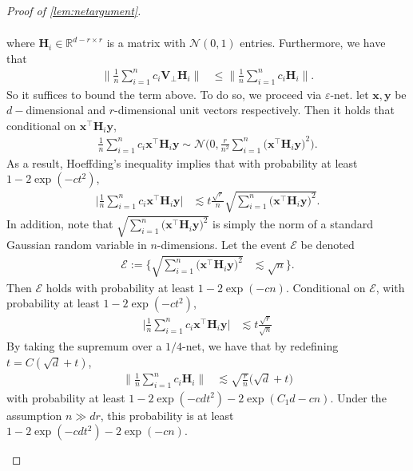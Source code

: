 \documentclass[10pt]{article}
\newcommand{\eps}{\ensuremath{\varepsilon}}
\renewcommand{\t}{^{\top}}
\theoremstyle{definition}
\begin{document}
\begin{proof}[Proof of \cref{lem:netargument}]
\begin{itemize}
\begin{align}
    \end{align}
    where $\bm{H}_i \in \mathbb{R}^{d-r \times r}$ is a matrix with $\mathcal{N}(0,1)$ entries. Furthermore, we have that
    \begin{align}
        \bigg\| \frac{1}{n} \sum_{i=1}^{n} c_i \bm{V}_{\perp} \bm{H}_i \bigg\| &\leq \bigg\| \frac{1}{n} \sum_{i=1}^{n} c_i \bm{H}_i \bigg\|.
    \end{align}
    So it suffices to bound the term above.  To do so, we proceed via $\eps$-net.  let $\bm{x}, \bm{y}$ be $d-$dimensional and $r$-dimensional unit vectors respectively.  Then it holds that conditional on $\bm{x}\t \bm{H}_i \bm{y}$, 
    \begin{align}
        \frac{1}{n} \sum_{i=1}^{n} c_i \bm{x}\t \bm{H}_i \bm{y} \sim \mathcal{N} \bigg( 0, \frac{r}{n^2} \sum_{i=1}^{n} \big(\bm{x}\t \bm{H}_i \bm{y} \big)^2 \bigg).
    \end{align}
    As a result, Hoeffding's inequality implies that with probability at least $1 - 2\exp(-c t^2)$,
    \begin{align}
        \bigg| \frac{1}{n}  \sum_{i=1}^{n} c_i \bm{x}\t \bm{H}_i \bm{y} \bigg| &\lesssim t \frac{\sqrt{r}}{n} \sqrt{\sum_{i=1}^{n} \big( \bm{x}\t \bm{H}_i \bm{y} \big)^2 }.
    \end{align}
    In addition, note that $\sqrt{\sum_{i=1}^{n} \big( \bm{x}\t \bm{H}_i \bm{y} \big)^2 }$ is simply the norm of a standard Gaussian random variable in $n$-dimensions. Let the event $\mathcal{E}$ be denoted
    \begin{align}
        \mathcal{E} := \bigg\{ \sqrt{\sum_{i=1}^{n} \big( \bm{x}\t \bm{H}_i \bm{y} \big)^2 } &\lesssim \sqrt{n} \bigg\}.
    \end{align}
    Then $\mathcal{E}$ holds with probability at least $1 -2 \exp( - c n)$.  Conditional on $\mathcal{E}$, with probability at least $1 - 2 \exp(- c t^2) $,
    \begin{align}
         \bigg| \frac{1}{n}  \sum_{i=1}^{n} c_i \bm{x}\t \bm{H}_i \bm{y} \bigg| &\lesssim t \frac{\sqrt{r}}{\sqrt{n}} 
    \end{align}
    By taking the supremum over a $1/4$-net, we have that by redefining $t = C( \sqrt{d} + t )$, 
    \begin{align}
        \bigg\| \frac{1}{n} \sum_{i=1}^{n} c_i \bm{H}_i \bigg\| &\lesssim  \sqrt{\frac{r}{n}} \bigg( \sqrt{d} + t \bigg)
    \end{align}
    with probability at least $1 - 2 \exp( - c d t^2) - 2 \exp( C_1 d - c n )$.  Under the assumption $n \gg dr$, this probability is at least $1 - 2 \exp( -c d t^2) - 2 \exp( -c n)$.    

\end{itemize}
\end{proof}
\end{document}
